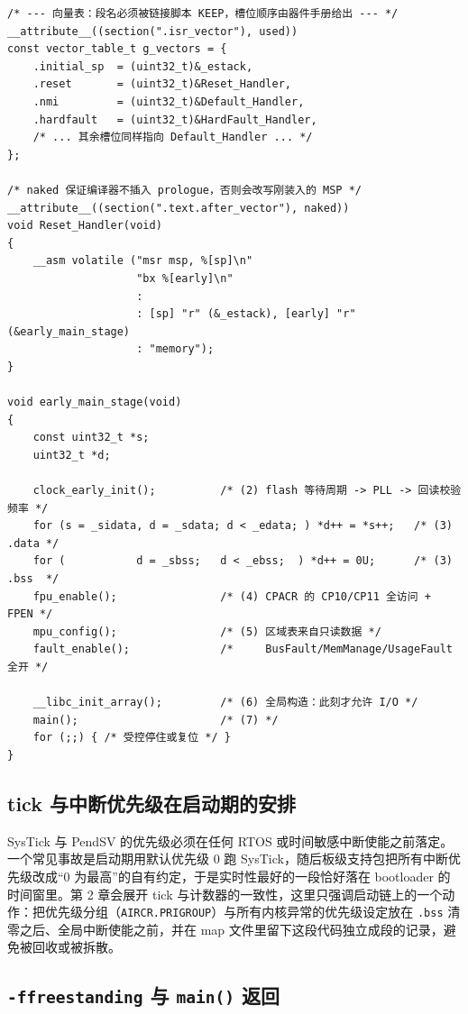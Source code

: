\documentclass[12pt,a4paper,fontset=fandol]{ctexbook}
\newcommand{\Fn}[1]{\texttt{#1()}}
\newcommand{\Tp}[1]{\texttt{#1}}
\begin{document}
\begin{lstlisting}[style=cstyle,caption={复位例程：向量表尾部入口、按序六个动作、\Fn{main} 返回后的死循环},label={lst:ch01-reset}]
/* --- 向量表：段名必须被链接脚本 KEEP，槽位顺序由器件手册给出 --- */
__attribute__((section(".isr_vector"), used))
const vector_table_t g_vectors = {
    .initial_sp  = (uint32_t)&_estack,
    .reset       = (uint32_t)&Reset_Handler,
    .nmi         = (uint32_t)&Default_Handler,
    .hardfault   = (uint32_t)&HardFault_Handler,
    /* ... 其余槽位同样指向 Default_Handler ... */
};

/* naked 保证编译器不插入 prologue，否则会改写刚装入的 MSP */
__attribute__((section(".text.after_vector"), naked))
void Reset_Handler(void)
{
    __asm volatile ("msr msp, %[sp]\n"
                    "bx %[early]\n"
                    :
                    : [sp] "r" (&_estack), [early] "r" (&early_main_stage)
                    : "memory");
}

void early_main_stage(void)
{
    const uint32_t *s;
    uint32_t *d;

    clock_early_init();          /* (2) flash 等待周期 -> PLL -> 回读校验频率 */
    for (s = _sidata, d = _sdata; d < _edata; ) *d++ = *s++;   /* (3) .data */
    for (           d = _sbss;   d < _ebss;  ) *d++ = 0U;      /* (3) .bss  */
    fpu_enable();                /* (4) CPACR 的 CP10/CP11 全访问 + FPEN */
    mpu_config();                /* (5) 区域表来自只读数据 */
    fault_enable();              /*     BusFault/MemManage/UsageFault 全开 */

    __libc_init_array();         /* (6) 全局构造：此刻才允许 I/O */
    main();                      /* (7) */
    for (;;) { /* 受控停住或复位 */ }
}
\end{lstlisting}

\subsection{tick 与中断优先级在启动期的安排}

SysTick 与 PendSV 的优先级必须在任何 RTOS 或时间敏感中断使能之前落定。一个常见事故是启动期用默认优先级 0 跑 SysTick，随后板级支持包把所有中断优先级改成``0 为最高''的自有约定，于是实时性最好的一段恰好落在 bootloader 的时间窗里。第 2 章会展开 tick 与计数器的一致性，这里只强调启动链上的一个动作：把优先级分组（\Tp{AIRCR.PRIGROUP}）与所有内核异常的优先级设定放在 \Tp{.bss} 清零之后、全局中断使能之前，并在 map 文件里留下这段代码独立成段的记录，避免被回收或被拆散。

\subsection{\Tp{-ffreestanding} 与 \Fn{main} 返回}
\end{document}
